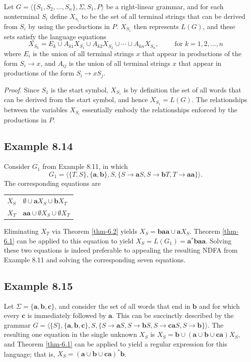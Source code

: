 \begin{thm}\label{thm-8.3}
Let $G=\langle\{S_1,S_2,\ldots,S_n\},\Sigma,S_1,P\rangle$ be a right-linear
grammar, and for each nonterminal $S_i$ define $X_{s_i}$ to be the set of all
terminal strings that can be derived from $S_i$ by using the productions in $P$.
$X_{S_1}$ then represents $L(G)$, and these sets satisfy the language equations
\[ X_{S_k} = E_k\cup A_{k1}X_{S_1}\cup A_{k2}X_{S_2}\cup\cdots\cup A_{kn}X_{S_n},
	\qquad\text{ for }k = 1,2,\ldots,n \]
where $E_i$ is the union of all terminal strings $x$ that appear in productions
of the form $S_i\rightarrow x$, and $A_{ij}$ is the union of all terminal
strings $x$ that appear in productions of the form $S_i\rightarrow xS_j$.

\emph{Proof.} Since $S_1$ is the start symbol, $X_{S_1}$ is by definition the
set of all words that can be derived from the start symbol, and hence $X_{S_1} =
L(G)$. The relationships between the variables $X_{S_i}$ essentially embody the
relationships enforced by the productions in $P$.
\end{thm}

\subsection*{Example 8.14}

Consider $G_1$ from Example 8.11, in which
\[ G_1 = \langle\{T,S\},\{\pmb{a},\pmb{b}\},S,\{S\rightarrow\pmb{a}S,S\rightarrow
	\pmb{b}T,T\rightarrow\pmb{aa}\}\rangle. \]
The corresponding equations are
\begin{center}\begin{tabular}{r@{ = }l}
$X_S$ & $\emptyset\cup\pmb{a}X_S\cup\pmb{b}X_T$ \\
$X_T$ & $\pmb{aa}\cup\emptyset X_S\cup\emptyset X_T$
\end{tabular}\end{center}
Eliminating $X_T$ via Theorem \ref{thm-6.2} yields $X_S=\pmb{baa}\cup\pmb{a}X_S$. Theorem
\ref{thm-6.1} can be applied to this equation to yield $X_S=L(G_1)=\pmb{a}^*\pmb{baa}$.
Solving these two equations is indeed preferable to appealing the resulting NDFA
from Example 8.11 and solving the corresponding seven equations.

\subsection*{Example 8.15}

Let $\Sigma=\{\pmb{a},\pmb{b},\pmb{c}\}$, and consider the set of all words that
end in $\pmb{b}$ and for which every $\pmb{c}$ is immediately followed by $\pmb{a}$.
This can be succinctly described by the grammar $G=\langle\{S\},\{\pmb{a},
\pmb{b},\pmb{c}\},S,\{S\rightarrow\pmb{a}S,S\rightarrow\pmb{b}S,S\rightarrow
\pmb{ca}S,S\rightarrow\pmb{b}\}\rangle$. The resulting one equation in the
single unknown $X_S$ is $X_S=\pmb{b}\cup(\pmb{a}\cup\pmb{b}\cup\pmb{ca})X_S$,
and Theorem \ref{thm-6.1} can be applied to yield a regular expression for this language;
that is, $X_S=(\pmb{a}\cup\pmb{b}\cup\pmb{ca})^*\pmb{b}$.

